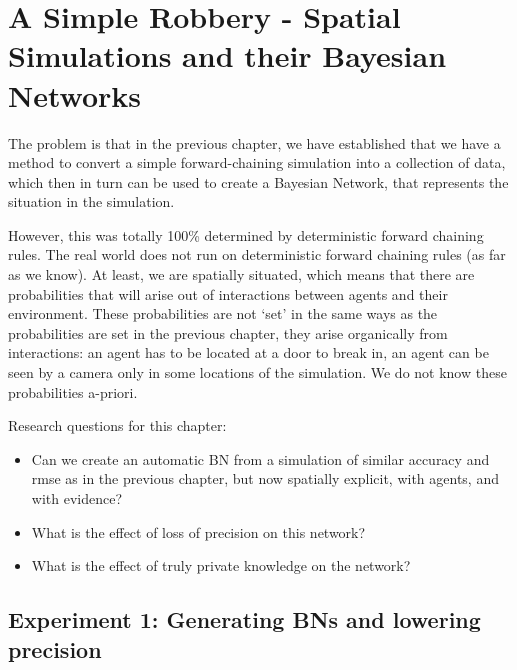  

\chapter[Simple Spatial Simulations]{A Simple Robbery - Spatial Simulations and their Bayesian Networks}

 The problem is that in the previous chapter, we have established that we have a method to convert a simple forward-chaining simulation into a collection of data, which then in turn can be used to create a Bayesian Network, that represents the situation in the simulation.
 
 However, this was totally 100\% determined by deterministic forward chaining rules. The real world does not run on deterministic forward chaining rules (as far as we know). At least, we are spatially situated, which means that there are probabilities that will arise out of interactions between agents and their environment. These probabilities are not `set' in the same ways as the probabilities are set in the previous chapter, they arise organically from interactions: an agent has to be located at a door to break in, an agent can be seen by a camera only in some locations of the simulation. We do not know these probabilities a-priori.
 
 Research questions for this chapter:
 
 \begin{itemize}
 \item Can we create an automatic BN from a simulation of similar accuracy and rmse as in the previous chapter, but now spatially explicit, with agents, and with evidence?
 \item What is the effect of loss of precision on this network?
 \item What is the effect of truly private knowledge on the network?
 \end{itemize}
 


\section{Experiment 1: Generating BNs and lowering precision}

